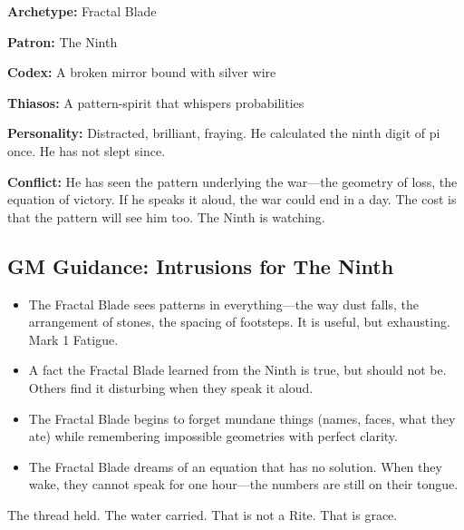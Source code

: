 \textbf{Archetype:} Fractal Blade

\textbf{Patron:} The Ninth

\textbf{Codex:} A broken mirror bound with silver wire

\textbf{Thiasos:} A pattern-spirit that whispers probabilities

\textbf{Personality:} Distracted, brilliant, fraying. He calculated the ninth digit of pi once. He has not slept since.

\textbf{Conflict:} He has seen the pattern underlying the war—the geometry of loss, the equation of victory. If he speaks it aloud, the war could end in a day. The cost is that the pattern will see him too. The Ninth is watching.

\subsection{GM Guidance: Intrusions for The Ninth}

\begin{itemize}
\item The Fractal Blade sees patterns in everything—the way dust falls, the arrangement of stones, the spacing of footsteps. It is useful, but exhausting. Mark 1 Fatigue.
\item A fact the Fractal Blade learned from the Ninth is true, but should not be. Others find it disturbing when they speak it aloud.
\item The Fractal Blade begins to forget mundane things (names, faces, what they ate) while remembering impossible geometries with perfect clarity.
\item The Fractal Blade dreams of an equation that has no solution. When they wake, they cannot speak for one hour—the numbers are still on their tongue.
\end{itemize}

The thread held. The water carried. That is not a Rite. That is grace.
